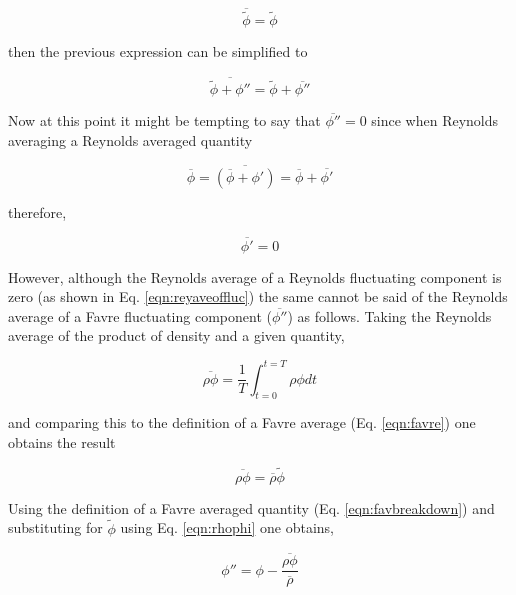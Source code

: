 \begin{equation}
	\overline{\tilde{\phi}} = \tilde{\phi}
\label{eqn:aveofave}
\end{equation}

	then the previous expression can be simplified to

\begin{equation}
	\overline{\tilde{\phi} + \phi''} = \tilde{\phi} + \overline{\phi''}	
\label{eqn:reyoffav}
\end{equation}

	Now at this point it might be tempting to say that $\overline{\phi''} = 0$ since when Reynolds averaging a 
Reynolds averaged quantity

\begin{displaymath}
	\overline{\phi} = \overline{(\overline{\phi} + \phi')} = \overline{\phi} + \overline{\phi'}
\end{displaymath}

	therefore,

\begin{equation}
	\overline{\phi'} = 0
\label{eqn:reyaveoffluc}
\end{equation}

	However, although the Reynolds average of a Reynolds fluctuating component is zero (as shown in
Eq. \ref{eqn:reyaveoffluc}) the same cannot be said of the Reynolds average of a Favre fluctuating component 
($\overline{\phi''}$) as follows.  Taking the Reynolds average of the product of density and a given quantity,

\begin{displaymath}
	\overline{\rho \phi} = \frac{1}{T} \int_{t=0}^{t=T} \rho \phi dt
\end{displaymath}

	and comparing this to the definition of a Favre average (Eq. \ref{eqn:favre}) one obtains the result

\begin{equation}
	\overline{\rho \phi} = \overline{\rho}\tilde{\phi}
\label{eqn:rhophi}
\end{equation}

	Using the definition of a Favre averaged quantity (Eq. \ref{eqn:favbreakdown}) and substituting
for $\tilde{\phi}$ using Eq. \ref{eqn:rhophi} one obtains,

\begin{displaymath}
	\phi'' = \phi - \frac{\overline{\rho \phi}}{\overline{\rho}}
\end{displaymath}


